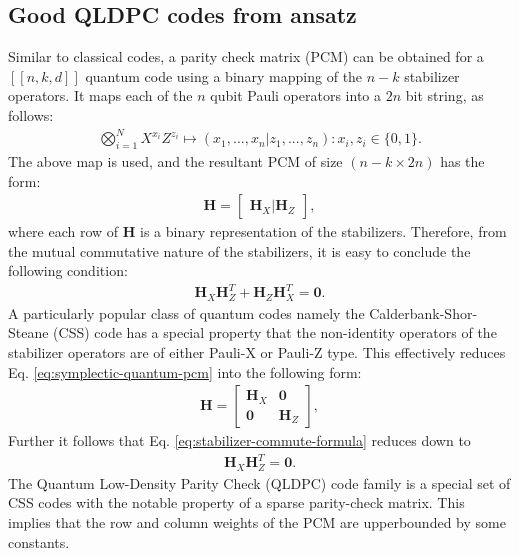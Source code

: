 \documentclass[%
 reprint,
 amsmath,amssymb,
 aps,
pra,
showkeys,
]{revtex4-2}
\begin{document}
\subsection{Good QLDPC codes from ansatz}
Similar to classical codes, a parity check matrix (PCM) can be obtained for a $[[n,k,d]]$ quantum code using a binary mapping of the $n-k$ stabilizer operators.
It maps each of the $n$ qubit Pauli operators into a $2n$ bit string, as follows:
\begin{align}
    \bigotimes_{i=1}^N X^{x_i}Z^{z_i} \mapsto (x_1, ..., x_n | z_1, ..., z_n) : x_i,z_i \in \{0,1\}.
\end{align}
The above map is used, and the resultant PCM of size $(n-k \times 2n)$ has the form:
\begin{align}
    \label{eq:symplectic-quantum-pcm}
    \mathbf{H} = \begin{bmatrix}
        \mathbf{H}_X | \mathbf{H}_Z
    \end{bmatrix},
\end{align}
where each row of $\mathbf{H}$ is a binary representation of the stabilizers.
Therefore, from the mutual commutative nature of the stabilizers, it is easy to conclude the following condition:
\begin{align}
\label{eq:stabilizer-commute-formula}
    \mathbf{H}_X\mathbf{H}^{T}_Z + \mathbf{H}_Z\mathbf{H}^{T}_X = \mathbf{0}.
\end{align}
A particularly popular class of quantum codes namely the Calderbank-Shor-Steane (CSS) code \cite{calderbank1996good, steane1996error} has a special property that the non-identity operators of the stabilizer operators are of either Pauli-X or Pauli-Z type.
This effectively reduces Eq. \ref{eq:symplectic-quantum-pcm} into the following form:
\begin{align}
    \mathbf{H} = \begin{bmatrix}
        \mathbf{H}_X & \mathbf{0}\\
        \mathbf{0} & \mathbf{H}_Z
    \end{bmatrix},
\end{align}
Further it follows that Eq. \ref{eq:stabilizer-commute-formula} reduces down to
\begin{align}
    \label{eq:css-commute-formula}
    \mathbf{H}_X\mathbf{H}^{T}_Z = \mathbf{0}.
\end{align}
The Quantum Low-Density Parity Check (QLDPC) code family is a special set of CSS codes with the notable property of a sparse parity-check matrix.
This implies that the row and column weights of the PCM are upperbounded by some constants.
\end{document}
